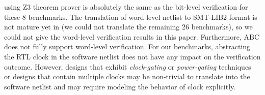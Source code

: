 using Z3 theorem prover is absolutely the same as the bit-level 
verification for these 8 benchmarks. The translation of word-level 
netlist to SMT-LIB2 format is not mature yet in \ebmc (we could not 
translate the remaining 26 benchmarks), so we could not give the 
word-level verification results in this paper. Furthermore, 
ABC does not fully support word-level verification.  
%
For our benchmarks, abstracting the RTL clock in the software 
netlist does not have any impact on the verification outcome.   
However, designs that exhibit 
\emph{clock-gating} or \emph{power-gating} techniques~\cite{lowpower} 
or designs that contain multiple clocks may be non-trivial to translate 
into the software netlist and may require modeling the behavior of clock 
explicitly.  
%
